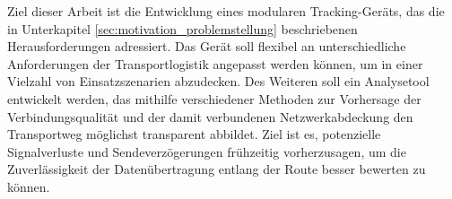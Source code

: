 Ziel dieser Arbeit ist die Entwicklung eines modularen Tracking-Geräts, das die in Unterkapitel \ref{sec:motivation_problemstellung} beschriebenen Herausforderungen adressiert.
Das Gerät soll flexibel an unterschiedliche Anforderungen der Transportlogistik angepasst werden können, um in einer Vielzahl von Einsatzszenarien abzudecken.
Des Weiteren soll ein Analysetool entwickelt werden, das mithilfe verschiedener Methoden zur Vorhersage der Verbindungsqualität und der damit verbundenen Netzwerkabdeckung den Transportweg möglichst transparent abbildet.
Ziel ist es, potenzielle Signalverluste und Sendeverzögerungen frühzeitig vorherzusagen, um die Zuverlässigkeit der Datenübertragung entlang der Route besser bewerten zu können.